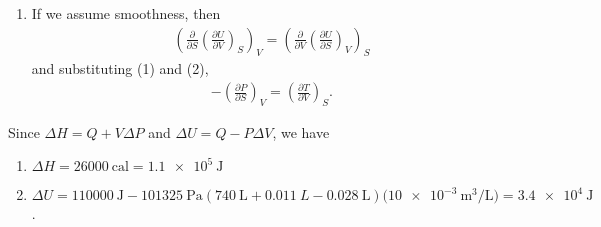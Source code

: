 \documentclass[a4paper,12pt]{article}
\begin{document}
\begin{enumerate}[label=\textbf{[\arabic*]}]
\begin{enumerate}
                \item
                    If we assume smoothness, then
                    \begin{align*}
                        \left( \frac{\partial}{\partial S} \left( \frac{\partial U}{\partial V} \right)_S \right)_V = \left( \frac{\partial}{\partial V} \left( \frac{\partial U}{\partial S} \right)_V \right)_S
                    \end{align*}
                    and substituting (1) and (2),
                    \begin{align*}
                        -\left( \frac{\partial P}{\partial S} \right)_V = \left( \frac{\partial T}{\partial V} \right)_S.
                    \end{align*}
            \end{enumerate}

        \item
            Since $\Delta H = Q + V \Delta P$ and $\Delta U = Q - P \Delta V$, we have
            \begin{enumerate}
                \item
                    $\Delta H = \SI{26000}{\text{cal}} = \SI{1.1e5}{\J}$

                \item
                    $\Delta U = \SI{110000}{\J} - \SI{101325}{\Pa} (\SI{740}{\L} + \SI{0.011}{L} - \SI{0.028}{\L}) (\SI{10e-3}{\m\cubed\per\L)} = \SI{3.4e4}{\J}$.
            \end{enumerate}


\end{enumerate}
\end{document}
